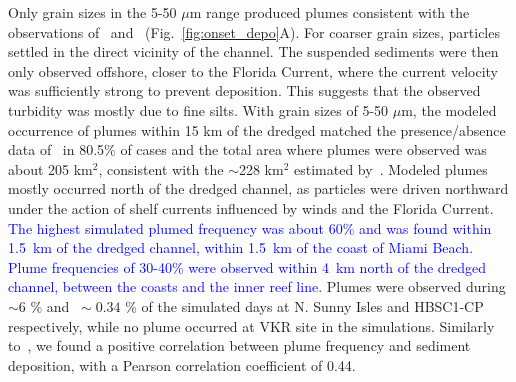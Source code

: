\documentclass[preprint,12pt,authoryear]{elsarticle}
\newcommand{\modif}[1]{\textcolor{blue}{#1}}
\begin{document}
Only grain sizes in the 5-50 $\mu$m range produced plumes consistent with the observations of~\cite{barnes2015sediment} and~\cite{cunning2019extensive} (Fig.~\ref{fig:onset_depo}A). For coarser grain sizes, particles settled in the direct vicinity of the channel. The suspended sediments were then only observed offshore, closer to the Florida Current, where the current velocity was sufficiently strong to prevent deposition. This suggests that the observed turbidity was mostly due to fine silts. With grain sizes of 5-50 $\mu$m, the modeled occurrence of plumes  within 15 km of the dredged matched the presence/absence data of~\cite{cunning2019extensive} in 80.5\% of cases and the total area where plumes were observed was about 205 km$^2$, consistent with the $\sim$228 km$^2$ estimated by~\cite{barnes2015sediment}. Modeled plumes mostly occurred north of the dredged channel, as particles were driven northward under the action of shelf currents influenced by winds and the Florida Current. \modif{The highest simulated plumed frequency was about 60\% and was found within 1.5~km of the dredged channel, within 1.5~km of the coast of Miami Beach. Plume frequencies of 30-40\% were observed within 4~km north of the dredged channel, between the coasts and the inner reef line}. Plumes were observed during  $\sim6$ \% and $~\sim0.34$ \% of the simulated days at N. Sunny Isles and HBSC1-CP respectively, while no plume occurred at VKR site in the simulations. Similarly to~\cite{cunning2019extensive}, we found a positive correlation between plume frequency and sediment deposition, with a Pearson correlation coefficient of 0.44.

\end{document}
